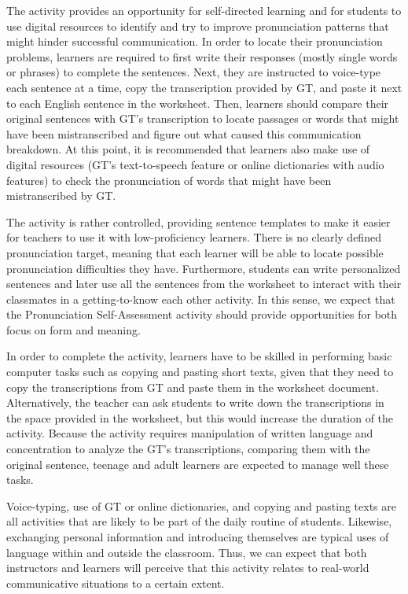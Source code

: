 \documentclass[english]{textolivre}
\begin{document}
The activity provides an opportunity for self-directed learning
\cite{song2007} and for students to use digital resources to identify
and try to improve pronunciation patterns that might hinder successful
communication. In order to locate their pronunciation problems, learners
are required to first write their responses (mostly single words or
phrases) to complete the sentences. Next, they are instructed to
voice-type each sentence at a time, copy the transcription provided by
GT, and paste it next to each English sentence in the worksheet. Then,
learners should compare their original sentences with GT's transcription
to locate passages or words that might have been mistranscribed and
figure out what caused this communication breakdown. At this point, it
is recommended that learners also make use of digital resources (GT's
text-to-speech feature or online dictionaries with audio features) to
check the pronunciation of words that might have been mistranscribed by
GT.

The activity is rather controlled, providing sentence templates to make
it easier for teachers to use it with low-proficiency learners. There is
no clearly defined pronunciation target, meaning that each learner will
be able to locate possible pronunciation difficulties they have.
Furthermore, students can write personalized sentences and later use all
the sentences from the worksheet to interact with their classmates in a
getting-to-know each other activity. In this sense, we expect that the
Pronunciation Self-Assessment activity should provide opportunities for
both focus on form and meaning.

In order to complete the activity, learners have to be skilled in
performing basic computer tasks such as copying and pasting short texts,
given that they need to copy the transcriptions from GT and paste them
in the worksheet document. Alternatively, the teacher can ask students
to write down the transcriptions in the space provided in the worksheet,
but this would increase the duration of the activity. Because the
activity requires manipulation of written language and concentration to
analyze the GT's transcriptions, comparing them with the original
sentence, teenage and adult learners are expected to manage well these
tasks.



Voice-typing, use of GT or online dictionaries, and copying and pasting
texts are all activities that are likely to be part of the daily routine
of students. Likewise, exchanging personal information and introducing
themselves are typical uses of language within and outside the
classroom. Thus, we can expect that both instructors and learners will
perceive that this activity relates to real-world communicative
situations to a certain extent.
\end{document}
